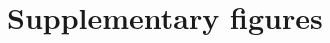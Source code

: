 %
%
%

\clearpage
\section*{Supplementary figures}
\setcounter{figure}{0}
\renewcommand{\thefigure}{S\arabic{figure}}

